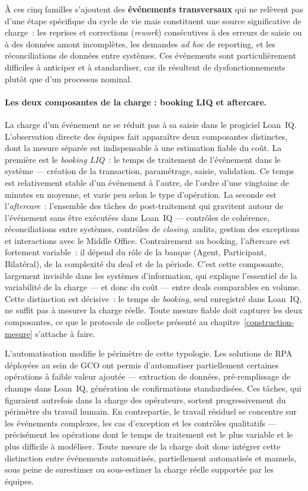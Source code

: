 \medskip

À ces cinq familles s'ajoutent des \textbf{événements transversaux} qui ne relèvent pas d'une étape spécifique du cycle de vie mais constituent une source significative de charge~: les reprises et corrections (\textit{rework}) consécutives à des erreurs de saisie ou à des données amont incomplètes, les demandes \textit{ad hoc} de reporting, et les réconciliations de données entre systèmes. Ces événements sont particulièrement difficiles à anticiper et à standardiser, car ils résultent de dysfonctionnements plutôt que d'un processus nominal.

\paragraph{Les deux composantes de la charge : booking LIQ et aftercare.}
La charge d'un événement ne se réduit pas à sa saisie dans le progiciel Loan~IQ. L'observation directe des équipes fait apparaître deux composantes distinctes, dont la mesure séparée est indispensable à une estimation fiable du coût. La première est le \textit{booking LIQ}~: le temps de traitement de l'événement dans le système --- création de la transaction, paramétrage, saisie, validation. Ce temps est relativement stable d'un événement à l'autre, de l'ordre d'une vingtaine de minutes en moyenne, et varie peu selon le type d'opération. La seconde est l'\textit{aftercare}~: l'ensemble des tâches de post-traitement qui gravitent autour de l'événement sans être exécutées dans Loan~IQ --- contrôles de cohérence, réconciliations entre systèmes, contrôles de \textit{closing}, audits, gestion des exceptions et interactions avec le Middle Office. Contrairement au booking, l'aftercare est fortement variable~: il dépend du rôle de la banque (Agent, Participant, Bilatéral), de la complexité du deal et de la période. C'est cette composante, largement invisible dans les systèmes d'information, qui explique l'essentiel de la variabilité de la charge --- et donc du coût --- entre deals comparables en volume. Cette distinction est décisive~: le temps de \textit{booking}, seul enregistré dans Loan~IQ, ne suffit pas à mesurer la charge réelle. Toute mesure fiable doit capturer les deux composantes, ce que le protocole de collecte présenté au chapitre~\ref{construction-mesure} s'attache à faire.

L'automatisation modifie le périmètre de cette typologie. Les solutions de RPA déployées au sein de GCO ont permis d'automatiser partiellement certaines opérations à faible valeur ajoutée --- extraction de données, pré-remplissage de champs dans Loan~IQ, génération de confirmations standardisées. Ces tâches, qui figuraient autrefois dans la charge des opérateurs, sortent progressivement du périmètre du travail humain. En contrepartie, le travail résiduel se concentre sur les événements complexes, les cas d'exception et les contrôles qualitatifs --- précisément les opérations dont le temps de traitement est le plus variable et le plus difficile à modéliser. Toute mesure de la charge doit donc intégrer cette distinction entre événements automatisés, partiellement automatisés et manuels, sous peine de surestimer ou sous-estimer la charge réelle supportée par les équipes.
\newpage
